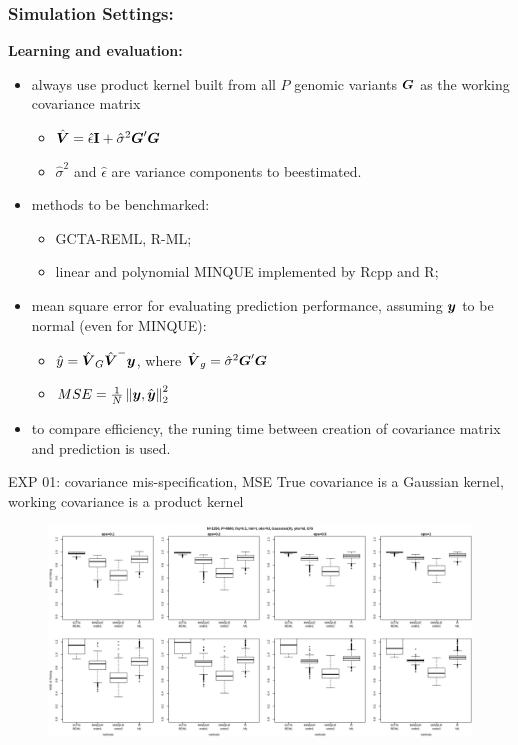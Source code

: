 \documentclass{beamer}
\begin{document}
\begin{frame}
  \frametitle{Simulation Settings:}
  \textbf{Learning and evaluation:}
  \begin{itemize}
  \item always use product kernel built from all $P$ genomic variants
    $\boldsymbol{G}$ as the working covariance matrix
    \begin{itemize}
    \item $\hat{\boldsymbol{V}} = \hat{\epsilon}\textrm{\textbf{I}} + \hat{\sigma}^2 \boldsymbol{G}^\prime \boldsymbol{G}$
    \item $\hat{\sigma}^2$ and $\hat{\epsilon}$ are variance
      components to beestimated.
    \end{itemize}
  \item methods to be benchmarked: 
    \begin{itemize}
    \item GCTA-REML, R-ML;
    \item linear and polynomial MINQUE implemented by Rcpp and R;
    \end{itemize}
  \item mean square error for evaluating prediction performance,
    assuming $\boldsymbol{y}$ to be normal (even for MINQUE):
    \begin{itemize}
    \item $\hat{y} = \hat{\boldsymbol{V}}_G \hat{\boldsymbol{V}}^- \boldsymbol{y}$, where
      $\hat{\boldsymbol{V}}_g = \hat{\sigma}^2\boldsymbol{G}^\prime\boldsymbol{G}$
    \item $MSE = \frac{1}{N} \left\lVert\boldsymbol{y}, \hat{\boldsymbol{y}}\right\rVert_2^2$
    \end{itemize}
  \item to  compare efficiency, the runing time between creation
    of covariance matrix and prediction is used.
  \end{itemize}
\end{frame}
\begin{frame}{EXP 01: covariance mis-specification, MSE}
  \scriptsize{True covariance is a Gaussian kernel, working covariance is a product kernel}
  \normalsize
  \begin{figure}
    \includegraphics[width=1.00\linewidth]{s01_bxp.png}
  \end{figure}
\end{frame}
\end{document}
